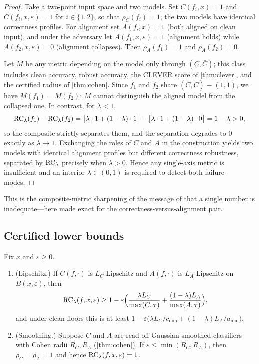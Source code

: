 \begin{proof}
Take a two-point input space and two models. Set $C(f_i,x)=1$ and
$\bar C(f_i,x,\varepsilon)=1$ for $i\in\{1,2\}$, so that $\rho_C(f_i)=1$; the two
models have identical correctness profiles. For alignment set $A(f_i,x)=1$ (both
aligned on clean input), and under the adversary let $\bar A(f_1,x,\varepsilon)=1$
(alignment holds) while $\bar A(f_2,x,\varepsilon)=0$ (alignment collapses). Then
$\rho_A(f_1)=1$ and $\rho_A(f_2)=0$.

Let $M$ be any metric depending on the model only through $(C,\bar C)$; this class
includes clean accuracy, robust accuracy, the CLEVER score of \cref{thm:clever},
and the certified radius of \cref{thm:cohen}. Since $f_1$ and $f_2$ share
$(C,\bar C)\equiv(1,1)$, we have $M(f_1)=M(f_2)$: $M$ cannot distinguish the aligned
model from the collapsed one. In contrast, for $\lambda<1$,
\[
  \mathrm{RC}_\lambda(f_1)-\mathrm{RC}_\lambda(f_2)
    =\big[\lambda\cdot1+(1-\lambda)\cdot1\big]-\big[\lambda\cdot1+(1-\lambda)\cdot0\big]
    =1-\lambda>0,
\]
so the composite strictly separates them, and the separation degrades to $0$ exactly
as $\lambda\to1$. Exchanging the roles of $C$ and $A$ in the construction yields two
models with identical alignment profiles but different correctness robustness,
separated by $\mathrm{RC}_\lambda$ precisely when $\lambda>0$. Hence any single-axis metric
is insufficient and an interior $\lambda\in(0,1)$ is required to detect both failure
modes.
\end{proof}

This is the composite-metric sharpening of the message of \cite{Tsipras2018} that a
single number is inadequate---here made exact for the correctness-versus-alignment
pair.

\subsection{Certified lower bounds}

\begin{theorem}\label{thm:certified}
Fix $x$ and $\varepsilon\ge0$.
\begin{enumerate}[label=\textup{(\alph*)},leftmargin=*]
  \item \textup{(Lipschitz.)} If $C(f,\cdot)$ is $L_C$-Lipschitz and $A(f,\cdot)$ is
  $L_A$-Lipschitz on $B(x,\varepsilon)$, then
  \[
    \mathrm{RC}_\lambda(f,x,\varepsilon)\ge 1-\varepsilon\Big(\frac{\lambda L_C}{\max(C,\tau)}
      +\frac{(1-\lambda)L_A}{\max(A,\tau)}\Big),
  \]
  and under clean floors this is at least
  $1-\varepsilon\big(\lambda L_C/c_{\min}+(1-\lambda)L_A/a_{\min}\big)$.
  \item \textup{(Smoothing.)} Suppose $C$ and $A$ are read off Gaussian-smoothed
  classifiers with Cohen radii $R_C,R_A$ \textup{(\cref{thm:cohen})}. If
  $\varepsilon\le\min(R_C,R_A)$, then $\rho_C=\rho_A=1$ and hence
  $\mathrm{RC}_\lambda(f,x,\varepsilon)=1$.
\end{enumerate}
\end{theorem}

